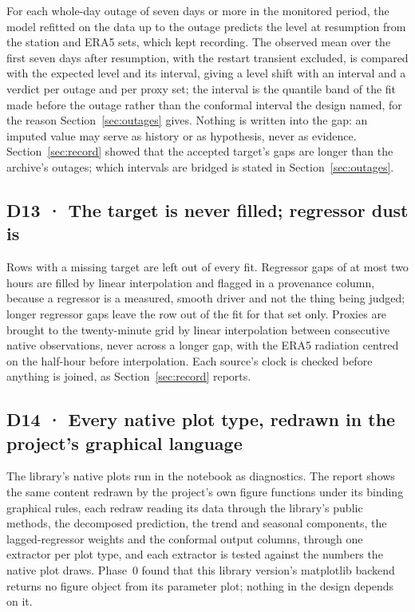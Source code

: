 \documentclass[11pt,a4paper]{article}
\begin{document}
For each whole-day outage of seven days or more in the monitored period, the
model refitted on the data up to the outage predicts the level at resumption
from the station and ERA5 sets, which kept recording. The observed mean over
the first seven days after resumption, with the restart transient excluded, is
compared with the expected level and its interval, giving a level shift with
an interval and a verdict per outage and per proxy set; the interval is the
quantile band of the fit made before the outage rather than the conformal
interval the design named, for the reason Section~\ref{sec:outages} gives. Nothing is
written into the gap: an imputed value may serve as history or as hypothesis,
never as evidence. Section~\ref{sec:record} showed that the accepted target's
gaps are longer than the archive's outages; which intervals are bridged is
stated in Section~\ref{sec:outages}.

\subsection{D13 · The target is never filled; regressor dust is}

Rows with a missing target are left out of every fit. Regressor gaps of at most
two hours are filled by linear interpolation and flagged in a provenance
column, because a regressor is a measured, smooth driver and not the thing
being judged; longer regressor gaps leave the row out of the fit for that set
only. Proxies are brought to the twenty-minute grid by linear interpolation
between consecutive native observations, never across a longer gap, with the
ERA5 radiation centred on the half-hour before interpolation. Each source's
clock is checked before anything is joined, as Section~\ref{sec:record}
reports.

\subsection{D14 · Every native plot type, redrawn in the project's graphical language}

The library's native plots run in the notebook as diagnostics. The report shows
the same content redrawn by the project's own figure functions under its
binding graphical rules, each redraw reading its data through the library's
public methods, the decomposed prediction, the trend and seasonal components,
the lagged-regressor weights and the conformal output columns, through one
extractor per plot type, and each extractor is tested against the numbers the
native plot draws. Phase~0 found that this library version's matplotlib
backend returns no figure object from its parameter plot; nothing in the
design depends on it.
\end{document}
